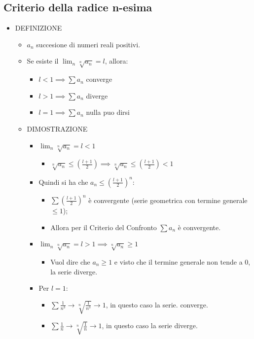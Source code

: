 \documentclass[10pt]{article}
\begin{document}
\subsection{Criterio della radice n-esima}
\begin{itemize}
\item
DEFINIZIONE
\begin{itemize}
\item
${a_n}$ succesione di numeri reali positivi.
\item
Se esiste il $\lim_{n}{\sqrt[n]{a_n} = l}$, allora:
\begin{itemize}
\item 
$l<1 \implies \sum a_n$ converge
\item 
$l>1 \implies \sum a_n$ diverge
\item 
$l=1 \implies \sum a_n$ nulla puo dirsi
\end{itemize}\medskip \smallskip
\item 
DIMOSTRAZIONE
\begin{itemize}
\item
$\displaystyle {\lim_{n}{\sqrt[n]{a_n} = l < 1}}$
\begin{itemize}
\item
$\displaystyle {\sqrt[n]{a_n} \leq \left(\frac{l+1}{2}\right) \implies 
\sqrt[n]{a_n} \leq \left(\frac{l+1}{2}\right) < 1}$
\end{itemize}
\item
Quindi si ha che $\displaystyle {a_n \leq \left(\frac{l+1}{2}\right)^n}$:
\begin{itemize}
\item
$\displaystyle{\sum \left(\frac{l+1}{2}\right)^n}$ è convergente (serie geometrica con termine generale $\leq 1$); \medskip
\item
Allora per il Criterio del Confronto $\sum a_n$ è convergente. \medskip \smallskip
\end{itemize}
\item
$\displaystyle {\lim_{n}{\sqrt[n]{a_n} = l > 1}} \implies \sqrt[n]{a_n} \geq 1$ \medskip
\begin{itemize}
\item
Vuol dire che $a_n \geq 1$ e visto che il termine generale non tende a 0, la serie diverge. \smallskip
\end{itemize}
\item
Per $l=1$:
\begin{itemize}
\item
$\displaystyle{\sum \frac{1}{n^3} \rightarrow \sqrt[n]{\frac{1}{n^3}} \rightarrow 1}$, in questo caso la serie. converge. \medskip
\item
$\displaystyle{\sum \frac{1}{n} \rightarrow \sqrt[n]{\frac{1}{n}} \rightarrow 1}$, in questo caso la serie diverge.
\end{itemize}
\end{itemize}
\medskip

\end{itemize}
\end{itemize}
\end{document}
